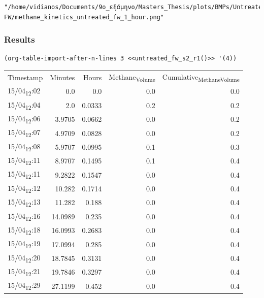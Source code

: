 \documentclass[11pt]{article}
\begin{document}
\begin{verbatim}
"/home/vidianos/Documents/9o_εξάμηνο/Masters_Thesis/plots/BMPs/Untreated FW/methane_kinetics_untreated_fw_1_hour.png"
\end{verbatim}

\subsubsection{Results}
\label{sec:orge08233b}

\begin{verbatim}
(org-table-import-after-n-lines 3 <<untreated_fw_s2_r1()>> '(4))
\end{verbatim}

\begin{center}
\begin{tabular}{lrrrr}
Timestamp & Minutes & Hours & Methane\textsubscript{Volume} & Cumulative\textsubscript{Methane}\textsubscript{Volume}\\[0pt]
15/04\textsubscript{12}:02 & 0.0 & 0.0 & 0.0 & 0.0\\[0pt]
15/04\textsubscript{12}:04 & 2.0 & 0.0333 & 0.2 & 0.2\\[0pt]
15/04\textsubscript{12}:06 & 3.9705 & 0.0662 & 0.0 & 0.2\\[0pt]
15/04\textsubscript{12}:07 & 4.9709 & 0.0828 & 0.0 & 0.2\\[0pt]
15/04\textsubscript{12}:08 & 5.9707 & 0.0995 & 0.1 & 0.3\\[0pt]
15/04\textsubscript{12}:11 & 8.9707 & 0.1495 & 0.1 & 0.4\\[0pt]
15/04\textsubscript{12}:11 & 9.2822 & 0.1547 & 0.0 & 0.4\\[0pt]
15/04\textsubscript{12}:12 & 10.282 & 0.1714 & 0.0 & 0.4\\[0pt]
15/04\textsubscript{12}:13 & 11.282 & 0.188 & 0.0 & 0.4\\[0pt]
15/04\textsubscript{12}:16 & 14.0989 & 0.235 & 0.0 & 0.4\\[0pt]
15/04\textsubscript{12}:18 & 16.0993 & 0.2683 & 0.0 & 0.4\\[0pt]
15/04\textsubscript{12}:19 & 17.0994 & 0.285 & 0.0 & 0.4\\[0pt]
15/04\textsubscript{12}:20 & 18.7845 & 0.3131 & 0.0 & 0.4\\[0pt]
15/04\textsubscript{12}:21 & 19.7846 & 0.3297 & 0.0 & 0.4\\[0pt]
15/04\textsubscript{12}:29 & 27.1199 & 0.452 & 0.0 & 0.4\\[0pt]

\end{tabular}
\end{center}
\end{document}
